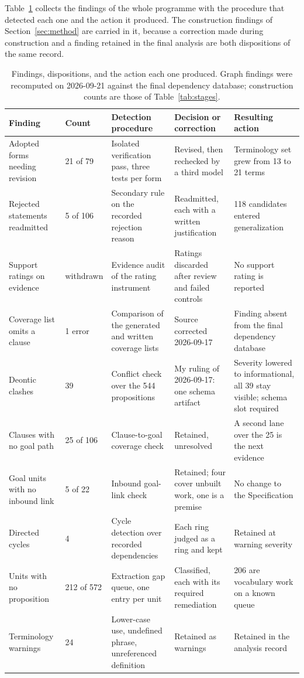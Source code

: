 Table~\ref{tab:findings} collects the findings of the whole programme with the procedure that detected each one and the action it produced. The construction findings of Section~\ref{sec:method} are carried in it, because a correction made during construction and a finding retained in the final analysis are both dispositions of the same record.

\begin{table}[t]
\centering
\caption{Findings, dispositions, and the action each one produced. Graph findings were recomputed on 2026-09-21 against the final dependency database; construction counts are those of Table~\ref{tab:stages}.}
\label{tab:findings}
\begin{tabular}{p{1.05in}p{0.6in}p{1.6in}p{1.5in}p{1.42in}}
\toprule
Finding & Count & Detection procedure & Decision or correction & Resulting action \\
\midrule
Adopted forms needing revision & 21 of 79 & Isolated verification pass, three tests per form & Revised, then rechecked by a third model & Terminology set grew from 13 to 21 terms \\
\addlinespace
Rejected statements readmitted & 5 of 106 & Secondary rule on the recorded rejection reason & Readmitted, each with a written justification & 118 candidates entered generalization \\
\addlinespace
Support ratings on evidence & withdrawn & Evidence audit of the rating instrument & Ratings discarded after review and failed controls & No support rating is reported \\
\addlinespace
Coverage list omits a clause & 1 error & Comparison of the generated and written coverage lists & Source corrected 2026-09-17 & Finding absent from the final dependency database \\
\addlinespace
Deontic clashes & 39 & Conflict check over the 544 propositions & My ruling of 2026-09-17: one schema artifact & Severity lowered to informational, all 39 stay visible; schema slot required \\
\addlinespace
Clauses with no goal path & 25 of 106 & Clause-to-goal coverage check & Retained, unresolved & A second lane over the 25 is the next evidence \\
\addlinespace
Goal units with no inbound link & 5 of 22 & Inbound goal-link check & Retained; four cover unbuilt work, one is a premise & No change to the Specification \\
\addlinespace
Directed cycles & 4 & Cycle detection over recorded dependencies & Each ring judged as a ring and kept & Retained at warning severity \\
\addlinespace
Units with no proposition & 212 of 572 & Extraction gap queue, one entry per unit & Classified, each with its required remediation & 206 are vocabulary work on a known queue \\
\addlinespace
Terminology warnings & 24 & Lower-case use, undefined phrase, unreferenced definition & Retained as warnings & Retained in the analysis record \\
\bottomrule
\end{tabular}
\end{table}

